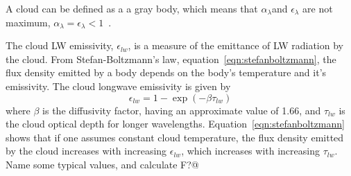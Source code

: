 A cloud can be defined as a a gray body, which means that $\alpha_{\lambda}$and $\epsilon_{\lambda}$ are not maximum, $\alpha_{\lambda}=\epsilon_{\lambda}<1$~\citep{Liou2002}.

The cloud LW emissivity, $\epsilon_{lw}$, is a measure of the emittance of LW radiation by the cloud. From Stefan-Boltzmann's law, equation~\ref{eqn:stefanboltzmann}, the flux density emitted by a body depends on the body's temperature and it's emissivity. The cloud longwave emissivity is given by
\begin{equation}
\epsilon_{lw} = 1 - \exp(-\beta \tau_{lw})
\label{eqn:epsilon_lw}
\end{equation}
where $\beta$ is the diffusivity factor, having an approximate value of 1.66, and $\tau_{lw}$ is the cloud optical depth for longer wavelengths. Equation~\ref{eqn:stefanboltzmann} shows that if one assumes constant cloud temperature, the flux density emitted by the cloud increases with increasing $\epsilon_{lw}$, which increases with increasing $\tau_{lw}$. Name some typical values, and calculate F?@

